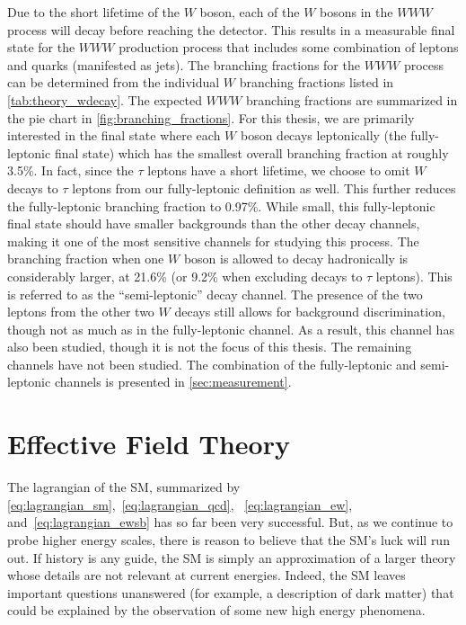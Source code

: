 Due to the short lifetime of the $W$ boson, each of the $W$ bosons
in the $WWW$ process will decay before reaching the detector.
This results in a measurable final state for the $WWW$ production 
process that includes some combination of leptons 
and quarks (manifested as jets).  The branching fractions for 
the $WWW$ process can be determined from the individual $W$ branching fractions
listed in \tab\ref{tab:theory_wdecay}.  The expected $WWW$ branching
fractions are summarized in the pie chart in \fig\ref{fig:branching_fractions}.
For this thesis, we are primarily interested in the final state
where each $W$ boson decays leptonically (the fully-leptonic final state) 
which has the smallest overall branching fraction at roughly 3.5\%.
In fact, since the $\tau$ leptons have a short lifetime, we choose to 
omit $W$ decays to $\tau$ leptons from our fully-leptonic
definition as well. This further reduces the fully-leptonic 
branching fraction to 0.97\%.  While small, this fully-leptonic final state
should have smaller backgrounds than the other 
decay channels, making it one of the most sensitive channels for studying
this process. The branching fraction when one $W$ boson is allowed
to decay hadronically is considerably larger, at 21.6\% (or
9.2\% when excluding decays to $\tau$ leptons). This is 
referred to as the ``semi-leptonic'' decay channel. The presence
of the two leptons from the other two $W$ decays still allows
for background discrimination, though not as much as in the fully-leptonic
channel. As a result, this channel has also been studied, though it 
is not the focus of this thesis. The remaining channels have
not been studied. The combination of the fully-leptonic
and semi-leptonic channels is presented in \sec\ref{sec:measurement}.



\section{Effective Field Theory}
\label{sec:eft}

The lagrangian of the SM, summarized by 
\eqn\eqref{eq:lagrangian_sm},~\eqref{eq:lagrangian_qcd},
~\eqref{eq:lagrangian_ew}, and~\eqref{eq:lagrangian_ewsb}
has so far been very successful. 
But, as we continue to probe higher energy scales, 
there is reason to believe that the SM's luck will run out.
If history is any guide, the SM is simply
an approximation of a larger theory whose details are not relevant
at current energies.
Indeed, the SM leaves important questions unanswered (for example, 
a description of dark matter) that could be explained
by the observation of some new high energy phenomena.  %

